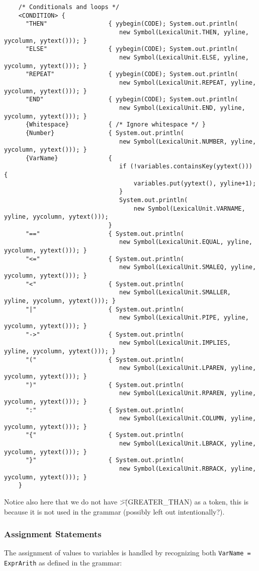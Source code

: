 \documentclass{article}
\begin{document}
	\begin{verbatim}
	/* Conditionals and loops */
	<CONDITION> {
	  "THEN"                 { yybegin(CODE); System.out.println(
								new Symbol(LexicalUnit.THEN, yyline, yycolumn, yytext())); }
	  "ELSE"                 { yybegin(CODE); System.out.println(
								new Symbol(LexicalUnit.ELSE, yyline, yycolumn, yytext())); }
	  "REPEAT"               { yybegin(CODE); System.out.println(
								new Symbol(LexicalUnit.REPEAT, yyline, yycolumn, yytext())); }
	  "END"                  { yybegin(CODE); System.out.println(
								new Symbol(LexicalUnit.END, yyline, yycolumn, yytext())); }
	  {Whitespace}           { /* Ignore whitespace */ }
	  {Number}               { System.out.println(
								new Symbol(LexicalUnit.NUMBER, yyline, yycolumn, yytext())); }
	  {VarName}              {
								if (!variables.containsKey(yytext())) {
									variables.put(yytext(), yyline+1);
								}
								System.out.println(
									new Symbol(LexicalUnit.VARNAME, yyline, yycolumn, yytext()));
							 }
	  "=="                   { System.out.println(
								new Symbol(LexicalUnit.EQUAL, yyline, yycolumn, yytext())); }
	  "<="                   { System.out.println(
								new Symbol(LexicalUnit.SMALEQ, yyline, yycolumn, yytext())); }
	  "<"                    { System.out.println(
								new Symbol(LexicalUnit.SMALLER, yyline, yycolumn, yytext())); }
	  "|"                    { System.out.println(
								new Symbol(LexicalUnit.PIPE, yyline, yycolumn, yytext())); }
	  "->"                   { System.out.println(
								new Symbol(LexicalUnit.IMPLIES, yyline, yycolumn, yytext())); }
	  "("                    { System.out.println(
								new Symbol(LexicalUnit.LPAREN, yyline, yycolumn, yytext())); }
	  ")"                    { System.out.println(
								new Symbol(LexicalUnit.RPAREN, yyline, yycolumn, yytext())); }
	  ":"                    { System.out.println(
								new Symbol(LexicalUnit.COLUMN, yyline, yycolumn, yytext())); }
	  "{"                    { System.out.println(
								new Symbol(LexicalUnit.LBRACK, yyline, yycolumn, yytext())); }
	  "}"                    { System.out.println(
								new Symbol(LexicalUnit.RBRACK, yyline, yycolumn, yytext())); }
	}
	\end{verbatim}
	Notice also here that we do not have \">\" (GREATER\_THAN) as a token, this is because it is not used in the grammar (possibly left out intentionally?).\\

	\subsubsection{Assignment Statements}
	The assignment of values to variables is handled by recognizing both \texttt{VarName = ExprArith} as defined in the grammar:
\end{document}
